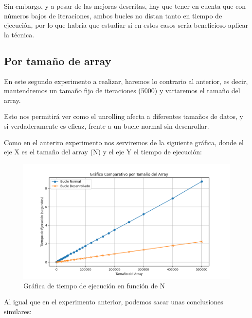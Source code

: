 \documentclass[a4paper,twocolumn]{article}
\begin{document}
Sin embargo, y a pesar de las mejoras descritas, hay que tener en cuenta que con números bajos de iteraciones, ambos bucles no distan tanto en tiempo de ejecución, por lo que habría que estudiar si en estos casos sería beneficioso aplicar la técnica.

\subsection{Por tamaño de array}

En este segundo experimento a realizar, haremos lo contrario al anterior, es decir, mantendremos un tamaño fijo de iteraciones (5000) y variaremos el tamaño del array.

Esto nos permitirá ver como el unrolling afecta a diferentes tamaños de datos, y si verdaderamente es eficaz, frente a un bucle normal sin desenrollar.

Como en el anteriro experimento nos serviremos de la siguiente gráfica, donde el eje X es el tamaño del array (N) y el eje Y el tiempo de ejecución:


\begin{figure}[H]
    \centering
    \includegraphics[width=\columnwidth]{img/arrayTam.png}
    \caption{Gráfica de tiempo de ejecución en función de N}
    \label{fig:iter}
\end{figure}

Al igual que en el experimento anterior, podemos sacar unas conclusiones similares:
\end{document}
